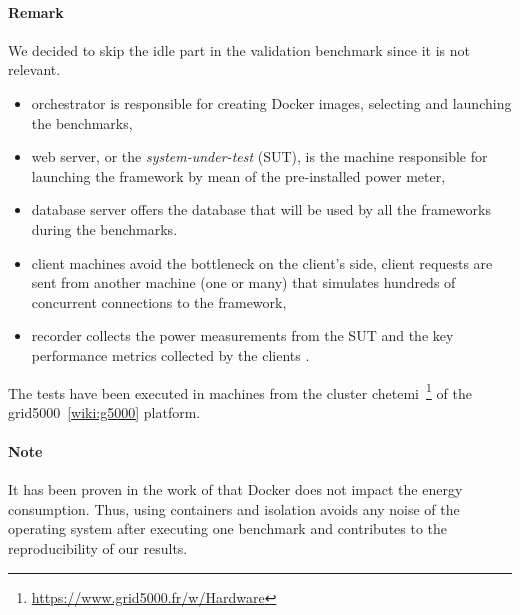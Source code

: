 \paragraph{Remark}
We decided to skip the idle part in the validation benchmark since it is not relevant.



\begin{itemize}
    \item \textsf{orchestrator} is responsible for creating Docker images, selecting and launching the benchmarks,
    \item \textsf{web server}, or the \emph{system-under-test} (SUT), is the machine responsible for launching the framework by mean of the pre-installed power meter,
    \item \textsf{database server} offers the database that will be used by all the frameworks during the benchmarks.
    \item \textsf{client machines} avoid the bottleneck on the client's side, client requests are sent from another machine (one or many) that simulates hundreds of concurrent connections to the framework,
    \item \textsf{recorder} collects the power measurements from the SUT and the key performance metrics collected by the clients .
\end{itemize}

The tests have been executed in machines from the cluster \textsf{chetemi}~\footnote{\url{https://www.grid5000.fr/w/Hardware}} of the grid5000~\ref{wiki:g5000} platform.


\paragraph{Note}
It has been proven in the work of \citeauthor{eddie_antonio_santos_how} that Docker does not impact the energy consumption.
Thus, using containers and isolation avoids any noise of the operating system after executing one benchmark and contributes to the reproducibility of our results.


